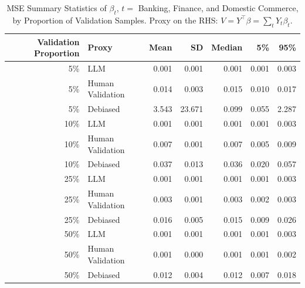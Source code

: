 \begin{table}

\caption{MSE Summary Statistics of $\beta_{t}$, $t=$ Banking, Finance, and Domestic Commerce, by Proportion of Validation Samples.
      Proxy on the RHS: $V = Y^\top \beta = \sum_{t} Y_t \beta_t$.}
\centering
\begin{tabular}[t]{rlrrrrr}
\toprule
Validation Proportion & Proxy & Mean & SD & Median & 5\% & 95\%\\
\midrule
5\% & LLM & 0.001 & 0.001 & 0.001 & 0.001 & 0.003\\
5\% & Human Validation & 0.014 & 0.003 & 0.015 & 0.010 & 0.017\\
5\% & Debiased & 3.543 & 23.671 & 0.099 & 0.055 & 2.287\\
10\% & LLM & 0.001 & 0.001 & 0.001 & 0.001 & 0.003\\
10\% & Human Validation & 0.007 & 0.001 & 0.007 & 0.005 & 0.009\\
10\% & Debiased & 0.037 & 0.013 & 0.036 & 0.020 & 0.057\\
25\% & LLM & 0.001 & 0.001 & 0.001 & 0.001 & 0.003\\
25\% & Human Validation & 0.003 & 0.001 & 0.003 & 0.002 & 0.003\\
25\% & Debiased & 0.016 & 0.005 & 0.015 & 0.009 & 0.026\\
50\% & LLM & 0.001 & 0.001 & 0.001 & 0.001 & 0.003\\
50\% & Human Validation & 0.001 & 0.000 & 0.001 & 0.001 & 0.002\\
50\% & Debiased & 0.012 & 0.004 & 0.012 & 0.007 & 0.018\\
\bottomrule
\end{tabular}
\end{table}
